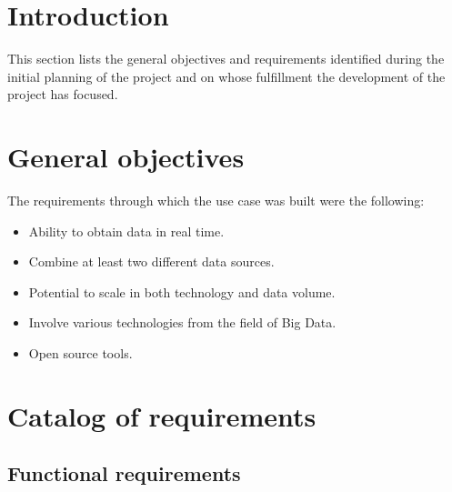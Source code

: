 
\section{Introduction}

\nonzeroparskip This section lists the general objectives and requirements identified during the initial planning of the project and on whose fulfillment the development of the project has focused.

\section{General objectives}

\nonzeroparskip The requirements through which the use case was built were the following:
\begin{itemize}
	\item Ability to obtain data in real time.
	\item Combine at least two different data sources.
	\item Potential to scale in both technology and data volume.
	\item Involve various technologies from the field of Big Data.
	\item Open source tools.
\end{itemize}

\section{Catalog of requirements}

\subsection{Functional requirements}


